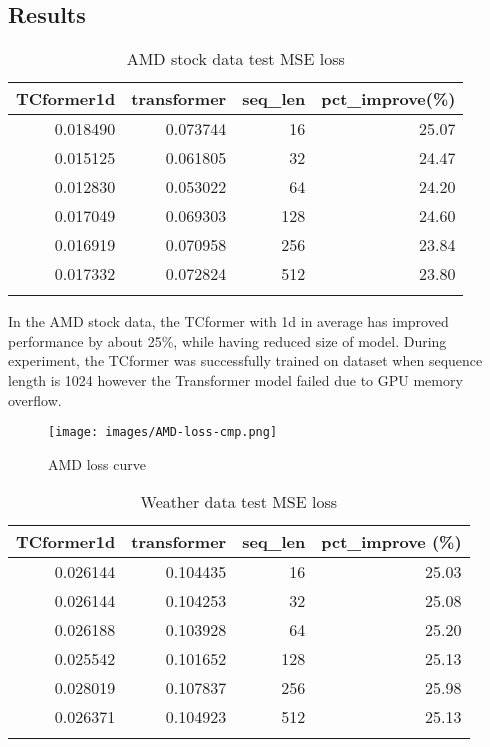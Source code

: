 \documentclass[stu,12pt,floatsintext]{apa7}
\begin{document}
\subsection{Results}

\begin{table}[H]
\caption{AMD stock data test MSE loss}
\centering
\begin{tabular}{rrrr}
\toprule
TCformer1d & transformer & seq\_len & pct\_improve(\%) \\
\midrule
0.018490 & 0.073744 & 16 & 25.07 \\
0.015125 & 0.061805 & 32 & 24.47 \\
0.012830 & 0.053022 & 64 & 24.20 \\
0.017049 & 0.069303 & 128 & 24.60 \\
0.016919 & 0.070958 & 256 & 23.84 \\
0.017332 & 0.072824 & 512 & 23.80 \\
\bottomrule \\
\end{tabular}
\label{tab:comparison}
\end{table}

In the AMD stock data, the TCformer with 1d in average has improved performance by about 25\%, while having reduced size of model. During experiment, the TCformer was successfully trained on dataset when sequence length is 1024 however the Transformer model failed due to GPU memory overflow.  

\begin{figure}[H]
    \centering
    \texttt{[image: images/AMD-loss-cmp.png]}
    \caption{AMD loss curve}
    \label{fig:AMD-loss-curve}
\end{figure}

\begin{table}[H]
\caption{Weather data test MSE loss}
\centering
\begin{tabular}{rrrr}
\toprule
TCformer1d & transformer & seq\_len & pct\_improve (\%) \\
\midrule
0.026144 & 0.104435 & 16 & 25.03 \\
0.026144 & 0.104253 & 32 & 25.08 \\
0.026188 & 0.103928 & 64 & 25.20 \\
0.025542 & 0.101652 & 128 & 25.13 \\
0.028019 & 0.107837 & 256 & 25.98 \\
0.026371 & 0.104923 & 512 & 25.13 \\
\bottomrule\\
\end{tabular}
\label{tab:comparison}
\end{table}
\end{document}
